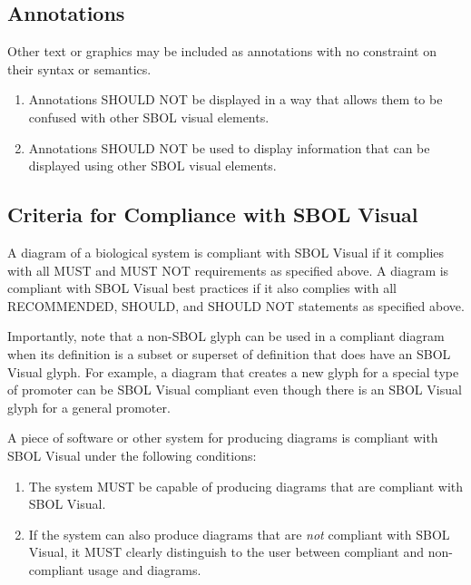 \subsection{Annotations}
Other text or graphics may be included as annotations with no constraint on their syntax or semantics.

\begin{enumerate}
\item Annotations SHOULD NOT be displayed in a way that allows them to be confused with other SBOL visual elements.
\item Annotations SHOULD NOT be used to display information that can be displayed using other SBOL visual elements.
\end{enumerate}

\subsection{Criteria for Compliance with SBOL Visual}

A diagram of a biological system is compliant with SBOL Visual if it complies with all MUST and MUST NOT requirements as specified above.
A diagram is compliant with SBOL Visual best practices if it also complies with all RECOMMENDED, SHOULD, and SHOULD NOT statements as specified above.

Importantly, note that a non-SBOL glyph can be used in a compliant
diagram when its definition is a subset or superset of definition that
does have an SBOL Visual glyph.  For example, a diagram that creates a
new glyph for a special type of promoter can be SBOL Visual compliant
even though there is an SBOL Visual glyph for a general promoter.

A piece of software or other system for producing diagrams is
compliant with SBOL Visual under the following conditions:
\begin{enumerate}
\item The system MUST be capable of producing diagrams that are
  compliant with SBOL Visual.
\item If the system can also produce diagrams that are {\em not}
  compliant with SBOL Visual, it MUST clearly distinguish to the user
  between compliant and non-compliant usage and diagrams.
\end{enumerate}


